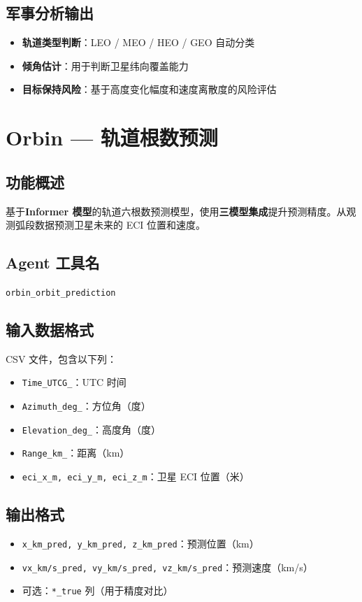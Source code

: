 \documentclass[12pt,a4paper,UTF8]{ctexart}
\begin{document}
\subsection{军事分析输出}
\begin{itemize}
    \item \textbf{轨道类型判断}：LEO / MEO / HEO / GEO 自动分类
    \item \textbf{倾角估计}：用于判断卫星纬向覆盖能力
    \item \textbf{目标保持风险}：基于高度变化幅度和速度离散度的风险评估
\end{itemize}

\section{Orbin — 轨道根数预测}

\subsection{功能概述}
基于\textbf{Informer 模型}的轨道六根数预测模型，使用\textbf{三模型集成}提升预测精度。从观测弧段数据预测卫星未来的 ECI 位置和速度。

\subsection{Agent 工具名}
\texttt{orbin\_orbit\_prediction}

\subsection{输入数据格式}
CSV 文件，包含以下列：
\begin{itemize}
    \item \texttt{Time\_UTCG\_}：UTC 时间
    \item \texttt{Azimuth\_deg\_}：方位角（度）
    \item \texttt{Elevation\_deg\_}：高度角（度）
    \item \texttt{Range\_km\_}：距离（km）
    \item \texttt{eci\_x\_m, eci\_y\_m, eci\_z\_m}：卫星 ECI 位置（米）
\end{itemize}

\subsection{输出格式}
\begin{itemize}
    \item \texttt{x\_km\_pred, y\_km\_pred, z\_km\_pred}：预测位置（km）
    \item \texttt{vx\_km/s\_pred, vy\_km/s\_pred, vz\_km/s\_pred}：预测速度（km/s）
    \item 可选：\texttt{*\_true} 列（用于精度对比）
\end{itemize}
\end{document}
